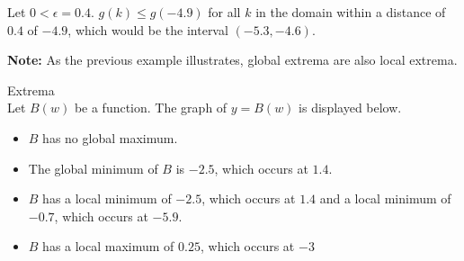 \documentclass{ximera}
\begin{document}
Let $0 < \epsilon = 0.4$.  $g(k) \leq g(-4.9)$ for all $k$ in the domain within a distance of $0.4$ of $-4.9$, which would be the interval $(-5.3, -4.6)$.




\textbf{Note:} As the previous example illustrates, global extrema are also local extrema.



\begin{example} Extrema \\

Let $B(w)$ be a function.  The graph of $y = B(w)$ is displayed below. 

\begin{image}
\end{image}

\begin{itemize}
\item $B$ has no global maximum.
\item The global minimum of $B$ is $-2.5$, which occurs at $1.4$.
\item $B$ has a local minimum of $-2.5$, which occurs at $1.4$ and a local minimum of $-0.7$, which occurs at $-5.9$.
\item $B$ has a local maximum of $0.25$, which occurs at $-3$
\end{itemize}

\end{example}
\end{document}
